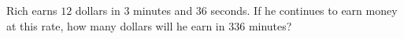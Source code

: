 Rich earns $12$ dollars in $3$ minutes and $36$ seconds. If he continues to earn money at this rate, how many dollars will he earn in $336$ minutes?
